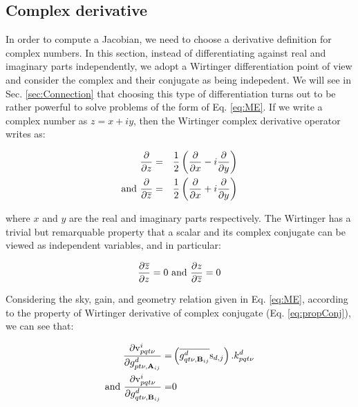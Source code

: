 \subsection{Complex derivative}
\label{sec:Cderiv}

In order to compute a Jacobian, we need to choose a
derivative definition for complex numbers. In this section, instead of
differentiating against real and imaginary parts independently, we
adopt a Wirtinger differentiation point of view and consider the
complex and their conjugate as being indepedent. We will see in
Sec. \ref{sec:Connection} that choosing this type of differentiation
turns out to be rather powerful to solve problems of the form of
Eq. \ref{eq:ME}. If we write a complex number as $z=x+iy$, then the
Wirtinger complex derivative operator writes as:


\begin{alignat}{3}
\frac{\partial }{\partial z}&=&\frac{1}{2}\left(\frac{\partial }{\partial x}-i\frac{\partial }{\partial y}\right)\\
\text{and }\frac{\partial }{\partial \overline{z}}&=&\frac{1}{2}\left(\frac{\partial }{\partial x}+i\frac{\partial }{\partial y}\right)
\end{alignat}

\noindent where $x$ and $y$ are the real and imaginary parts
respectively. The
Wirtinger has a trivial but remarquable property that a scalar and its
complex conjugate can be viewed as independent variables, and in
particular:


\begin{equation}
\label{eq:propConj}
\frac{\partial \overline{z}}{\partial z}=0
\text{ and }
\frac{\partial z}{\partial \overline{z}}=0
\end{equation}


Considering the sky, gain, and geometry relation given in
Eq. \ref{eq:ME}, according to the property of Wirtinger derivative of complex
conjugate (Eq. \ref{eq:propConj}), we can see that:

\begin{alignat}{3}
\label{eq:Deriv_gp}
\frac{\partial \mathrm{v}^i_{pqt\nu}}{\partial g^{d}_{pt\nu,\textbf{A}_{ij}}}=&
\left(\conj{g^{d}_{qt\nu,\textbf{B}_{ij}}}\text{s}_{d,j}\right).k^{d}_{pqt\nu}\\
\label{eq:Deriv_gq}
\text{and}\ 
\frac{\partial \mathrm{v}^i_{pqt\nu}}{\partial g^{d}_{qt\nu,\textbf{B}_{ij}}}=&0
\end{alignat}

